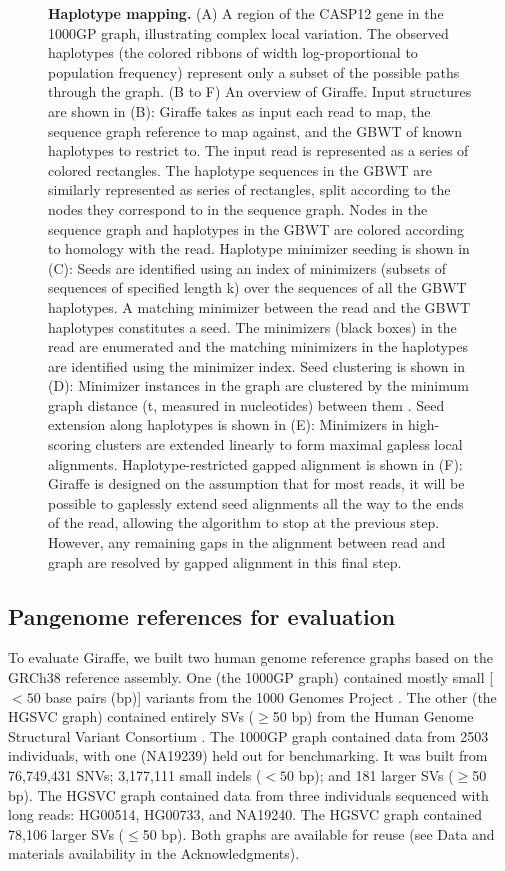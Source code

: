 \documentclass[11pt]{ucscthesis}
\begin{document}
\begin{figure}
    \caption[Short read giraffe algorithm]{\textbf{Haplotype mapping.} (A) A region of the CASP12 gene in the 1000GP graph, illustrating complex local variation. The observed haplotypes (the colored ribbons of width log-proportional to population frequency) represent only a subset of the possible paths through the graph. (B to F) An overview of Giraffe. Input structures are shown in (B): Giraffe takes as input each read to map, the sequence graph reference to map against, and the GBWT of known haplotypes to restrict to. The input read is represented as a series of colored rectangles. The haplotype sequences in the GBWT are similarly represented as series of rectangles, split according to the nodes they correspond to in the sequence graph. Nodes in the sequence graph and haplotypes in the GBWT are colored according to homology with the read. Haplotype minimizer seeding is shown in (C): Seeds are identified using an index of minimizers (subsets of sequences of specified length k)\cite{Roberts2004} over the sequences of all the GBWT haplotypes. A matching minimizer between the read and the GBWT haplotypes constitutes a seed. The minimizers (black boxes) in the read are enumerated and the matching minimizers in the haplotypes are identified using the minimizer index. Seed clustering is shown in (D): Minimizer instances in the graph are clustered by the minimum graph distance (t, measured in nucleotides) between them \cite{chang_distance_2020}. Seed extension along haplotypes is shown in (E): Minimizers in high-scoring clusters are extended linearly to form maximal gapless local alignments. Haplotype-restricted gapped alignment is shown in (F): Giraffe is designed on the assumption that for most reads, it will be possible to gaplessly extend seed alignments all the way to the ends of the read, allowing the algorithm to stop at the previous step. However, any remaining gaps in the alignment between read and graph are resolved by gapped alignment in this final step.}
    \label{fig:aim2_fig1}
\end{figure}

\subsection{Pangenome references for evaluation}
To evaluate Giraffe, we built two human genome reference graphs based on the GRCh38 reference assembly.
One (the 1000GP graph) contained mostly small [$<50$ base pairs (bp)] variants from the 1000 Genomes Project \cite{1000gp_2015}.
The other (the HGSVC graph) contained entirely SVs ($\geq$50 bp) from the Human Genome Structural Variant Consortium \cite{chaisson_sv_2019}.
The 1000GP graph contained data from 2503 individuals, with one (NA19239) held out for benchmarking.
It was built from 76,749,431 SNVs; 3,177,111 small indels ($<50$ bp); and 181 larger SVs ($\geq$50 bp).
The HGSVC graph contained data from three individuals sequenced with long reads: HG00514, HG00733, and NA19240.
The HGSVC graph contained 78,106 larger SVs ($\leq$50 bp). Both graphs are available for reuse (see Data and materials availability in the Acknowledgments).
\end{document}
